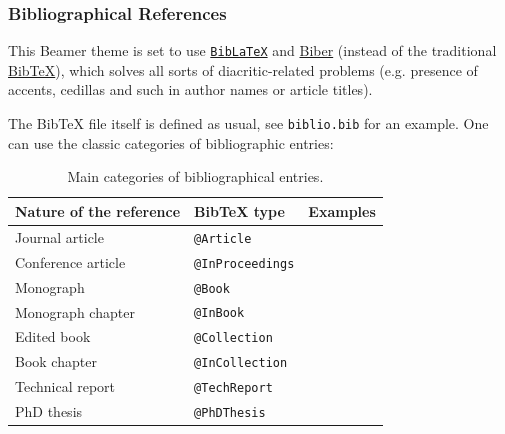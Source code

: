 \documentclass[10pt,    %
    english,            %
    xcolor=table,       %
    envcountsect,       %
    aspectratio=43      %
]{beamer}
\begin{document}
\begin{frame}
    \frametitle{Bibliographical References}
    
    This Beamer theme is set to use \href{https://ctan.org/pkg/biblatex?lang=en}{\texttt{BibLaTeX}} and \href{http://biblatex-biber.sourceforge.net/}{Biber} (instead of the traditional \href{http://www.bibtex.org/}{BibTeX}), which solves all sorts of diacritic-related problems (e.g. presence of accents, cedillas and such in author names or article titles).
    
    \medskip
    The BibTeX file itself is defined as usual, see \texttt{biblio.bib} for an example. One can use the classic categories of bibliographic entries:
    \nocite{Cecillon2019a}  %
    
    \begin{table}[H]
        \small
        \centering
        \begin{tabular}{l l r}
            \hline
	        \rowcolor{fgLightRed} 
            \textbf{Nature of the reference} & \textbf{BibTeX type} & \textbf{Examples}\\
            \hline
            Journal article & \texttt{@Article} & \cite{Fortunato2010, Cossu2016} \\
            Conference article & \texttt{@InProceedings} & \cite{Wei1989, Mauttone2008} \\
            Monograph & \texttt{@Book} & \cite{Wolsey1998, Masuda2016} \\
            Monograph chapter & \texttt{@InBook} & \cite{Mainzer2007a, Reichardt2009a} \\
            Edited book & \texttt{@Collection} & \cite{Pastor-Satorras2003a, Brandes2005} \\
            Book chapter & \texttt{@InCollection} & \cite{Danon2007, Labatut2012a} \\
            Technical report & \texttt{@TechReport} & \cite{Rosvall2009a, Paraskevopoulos2013} \\
            PhD thesis & \texttt{@PhDThesis} & \cite{Wong1978, Gerbaud2010} \\
            \hline
        \end{tabular}
        \vspace{-0.25cm}
        \caption{Main categories of bibliographical entries.}
        \label{tab:bibtex}
    \end{table}
\end{frame}
\end{document}
